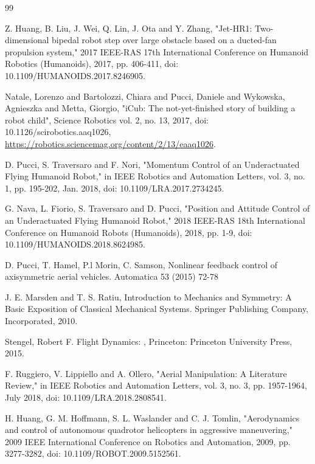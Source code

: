\begin{thebibliography}{99}

 Z. Huang, B. Liu, J. Wei, Q. Lin, J. Ota and Y. Zhang, "Jet-HR1: Two-dimensional bipedal robot step over large obstacle based on a ducted-fan propulsion system," 2017 IEEE-RAS 17th International Conference on Humanoid Robotics (Humanoids), 2017, pp. 406-411, doi: 10.1109/HUMANOIDS.2017.8246905.

 Natale, Lorenzo and Bartolozzi, Chiara and Pucci, Daniele and Wykowska, Agnieszka and Metta, Giorgio, "iCub: The not-yet-finished story of building a robot child", Science Robotics vol. 2, no. 13, 2017, doi: 10.1126/scirobotics.aaq1026, \url{https://robotics.sciencemag.org/content/2/13/eaaq1026}.

 D. Pucci, S. Traversaro and F. Nori, "Momentum Control of an Underactuated Flying Humanoid Robot," in IEEE Robotics and Automation Letters, vol. 3, no. 1, pp. 195-202, Jan. 2018, doi: 10.1109/LRA.2017.2734245.

 G. Nava, L. Fiorio, S. Traversaro and D. Pucci, "Position and Attitude Control of an Underactuated Flying Humanoid Robot," 2018 IEEE-RAS 18th International Conference on Humanoid Robots (Humanoids), 2018, pp. 1-9, doi: 10.1109/HUMANOIDS.2018.8624985.

 D. Pucci, T. Hamel, P.l Morin, C. Samson, Nonlinear feedback control of axisymmetric aerial vehicles.   Automatica 53 (2015) 72-78

 J. E. Marsden and T. S. Ratiu, Introduction to Mechanics and Symmetry: A Basic Exposition of Classical Mechanical Systems.   Springer Publishing Company, Incorporated, 2010.

 Stengel, Robert F. Flight Dynamics: , Princeton: Princeton University Press, 2015.

 F. Ruggiero, V. Lippiello and A. Ollero, "Aerial Manipulation: A Literature Review," in IEEE Robotics and Automation Letters, vol. 3, no. 3, pp. 1957-1964, July 2018, doi: 10.1109/LRA.2018.2808541.

 H. Huang, G. M. Hoffmann, S. L. Waslander and C. J. Tomlin, "Aerodynamics and control of autonomous quadrotor helicopters in aggressive maneuvering," 2009 IEEE International Conference on Robotics and Automation, 2009, pp. 3277-3282, doi: 10.1109/ROBOT.2009.5152561.


\end{thebibliography}
